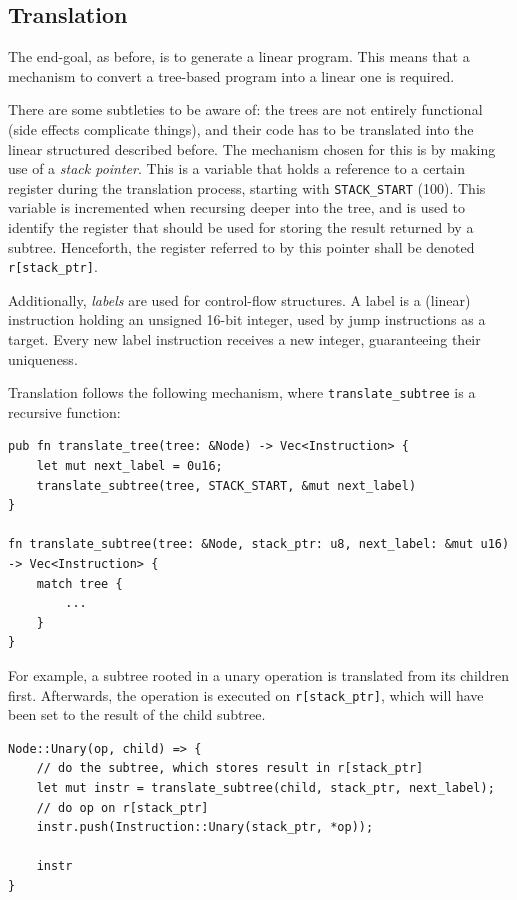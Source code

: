 \documentclass{report}
\begin{document}
\subsection{Translation}
The end-goal, as before, is to generate a linear program. This means that a mechanism to convert a tree-based program into a linear one is required.

There are some subtleties to be aware of: the trees are not entirely functional (side effects complicate things), and their code has to be translated into the linear structured described before. The mechanism chosen for this is by making use of a \emph{stack pointer}. This is a variable that holds a reference to a certain register during the translation process, starting with \verb|STACK_START| (100). This variable is incremented when recursing deeper into the tree, and is used to identify the register that should be used for storing the result returned by a subtree. Henceforth, the register referred to by this pointer shall be denoted \verb|r[stack_ptr]|.

Additionally, \emph{labels} are used for control-flow structures. A label is a (linear) instruction holding an unsigned 16-bit integer, used by jump instructions as a target. Every new label instruction receives a new integer, guaranteeing their uniqueness.

Translation follows the following mechanism, where \verb|translate_subtree| is a recursive function:

\begin{verbatim}
pub fn translate_tree(tree: &Node) -> Vec<Instruction> {
    let mut next_label = 0u16;
    translate_subtree(tree, STACK_START, &mut next_label)
}

fn translate_subtree(tree: &Node, stack_ptr: u8, next_label: &mut u16) -> Vec<Instruction> {
    match tree {
        ...
    }
}
\end{verbatim}

For example, a subtree rooted in a unary operation is translated from its children first. Afterwards, the operation is executed on \verb|r[stack_ptr]|, which will have been set to the result of the child subtree.

\begin{verbatim}
Node::Unary(op, child) => {
    // do the subtree, which stores result in r[stack_ptr]
    let mut instr = translate_subtree(child, stack_ptr, next_label);
    // do op on r[stack_ptr]
    instr.push(Instruction::Unary(stack_ptr, *op));

    instr
}
\end{verbatim}
\end{document}
